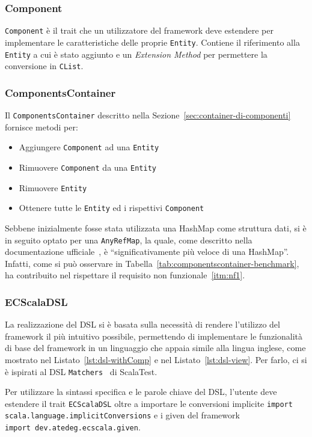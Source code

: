 \subsubsection{Component}\label{subsubsec:component-desc}
\texttt{Component} è il trait che un utilizzatore del framework deve estendere per implementare le caratteristiche delle
proprie \texttt{Entity}.
Contiene il riferimento alla \texttt{Entity} a cui è stato aggiunto e un \textit{Extension Method}\cite{extensionmethods} per permettere la conversione
in \texttt{CList}.

\subsubsection{ComponentsContainer}\label{subsubsec:components-container}
Il \texttt{ComponentsContainer} descritto nella Sezione~\ref{sec:container-di-componenti} fornisce metodi per:
\begin{itemize}
    \item Aggiungere \texttt{Component} ad una \texttt{Entity}
    \item Rimuovere \texttt{Component} da una \texttt{Entity}
    \item Rimuovere \texttt{Entity}
    \item Ottenere tutte le \texttt{Entity} ed i rispettivi \texttt{Component}
\end{itemize}
Sebbene inizialmente fosse stata utilizzata una HashMap come struttura dati, si è in seguito optato
per una \texttt{AnyRefMap}, la quale, come descritto nella documentazione ufficiale~\cite{anyRefMap},
è ``significativamente più veloce di una HashMap''. Infatti, come si può osservare in Tabella~\ref{tab:componentscontainer-benchmark},
ha contribuito nel rispettare il requisito non funzionale~\ref{itm:nf1}.

\subsubsection{ECScalaDSL}\label{subsubsec:dsl-impl}
La realizzazione del DSL si è basata sulla necessità di rendere l'utilizzo del framework il più intuitivo possibile,
permettendo di implementare le funzionalità di base del framework in un linguaggio che appaia simile alla lingua inglese, come mostrato nel
Listato~\ref{lst:dsl-withComp} e nel Listato~\ref{lst:dsl-view}.
Per farlo, ci si è ispirati al DSL \texttt{Matchers}~\cite{matchers} di ScalaTest.

Per utilizzare la sintassi specifica e le parole chiave del DSL, l'utente deve estendere il trait \texttt{ECScalaDSL} oltre a importare
le conversioni implicite \texttt{import scala.language.implicitConversions} e i given del framework\\
\texttt{import dev.atedeg.ecscala.given}.

